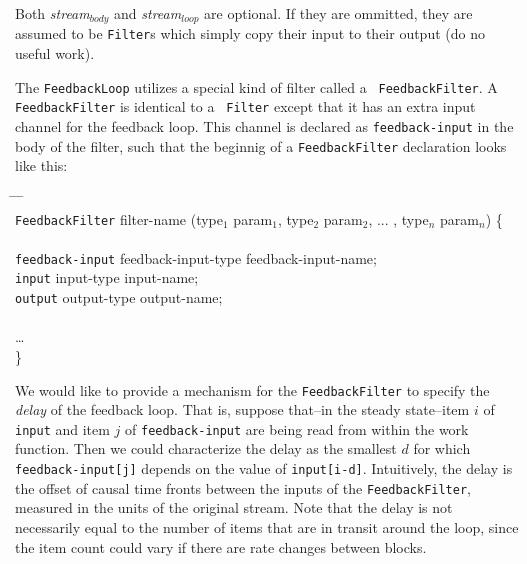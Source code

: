 Both {\it stream$_{body}$} and {\it stream$_{loop}$} are optional.
If they are ommitted, they are assumed to be {\tt Filter}s which simply
copy their input to their output (do no useful work).

\medskip
{}
\medskip

The {\tt FeedbackLoop} utilizes a special kind of filter called a {\tt
FeedbackFilter}.  A {\tt FeedbackFilter} is identical to a {\tt
Filter} except that it has an extra input channel for the feedback
loop.  This channel is declared as {\tt feedback-input} in the body of
the filter, such that the beginnig of a {\tt FeedbackFilter}
declaration looks like this:

\begin{tabbing}
\hspace{0.2in} \= \hspace{0.2in} \= \hspace{0.2in} \= \hspace{0.2in} \= \\

{\tt FeedbackFilter} filter-name (type$_1$ param$_1$, type$_2$ param$_2$,
... , type$_n$ param$_n$) \{ \\ \\

\> {\tt feedback-input} feedback-input-type feedback-input-name; \\
\> {\tt input} input-type input-name; \\
\> {\tt output} output-type output-name; \\ \\

\> \dots \\
\}
\end{tabbing}

We would like to provide a mechanism for the {\tt FeedbackFilter} to
specify the {\it delay} of the feedback loop.  That is, suppose
that--in the steady state--item $i$ of {\tt input} and item $j$ of
{\tt feedback-input} are being read from within the work function.
Then we could
characterize the delay as the smallest $d$ for which {\tt
feedback-input[j]} depends on the value of {\tt input[i-d]}.
Intuitively, the delay is the offset of causal time fronts between the
inputs of the {\tt FeedbackFilter}, measured in the units of the
original stream.  Note that the delay is not necessarily equal to the
number of items that are in transit around the loop, since the item
count could vary if there are rate changes between blocks.

